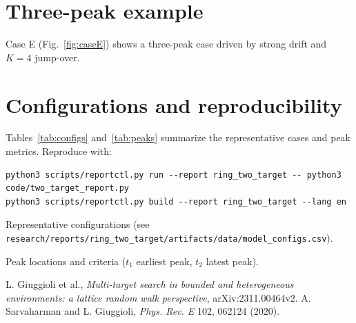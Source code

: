 \documentclass[11pt]{article}
\begin{document}
\section*{Three-peak example}
Case E (Fig.~\ref{fig:caseE}) shows a three-peak case driven by strong drift and $K=4$ jump-over.

\section*{Configurations and reproducibility}
Tables~\ref{tab:configs} and~\ref{tab:peaks} summarize the representative cases and peak metrics.
Reproduce with:
\begin{verbatim}
python3 scripts/reportctl.py run --report ring_two_target -- python3 code/two_target_report.py
python3 scripts/reportctl.py build --report ring_two_target --lang en
\end{verbatim}

\begin{table}[!htbp]
  \centering
  \caption{Representative configurations (see \texttt{research/reports/ring\_two\_target/artifacts/data/model\_configs.csv}).}
  \label{tab:configs}
  
\end{table}

\begin{table}[!htbp]
  \centering
  \caption{Peak locations and criteria ($t_1$ earliest peak, $t_2$ latest peak).}
  \label{tab:peaks}
  
\end{table}

\begin{thebibliography}{9}
L. Giuggioli et al., \emph{Multi-target search in bounded and heterogeneous environments: a lattice random walk perspective}, arXiv:2311.00464v2.
A. Sarvaharman and L. Giuggioli, \emph{Phys. Rev. E} 102, 062124 (2020).
\end{thebibliography}
\end{document}

